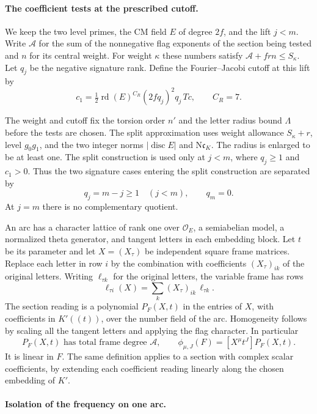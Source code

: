 \paragraph{The coefficient tests at the prescribed cutoff.}
We keep the two level primes, the CM field \(E\) of degree \(2f\),
and the lift \(j<m\). Write \(\mathcal A\) for the sum of the
nonnegative flag exponents of the section being tested and \(n\)
for its central weight. For weight \(\kappa\) these numbers satisfy
\(\mathcal A+frn\le S_\kappa\). Let \(q_j\) be the negative signature rank. Define the
Fourier--Jacobi cutoff at this lift by
\[
 c_1=\tfrac12\operatorname{rd}(E)^{C_R}(2fq_j)^2q_j\,Tc,
 \qquad C_R=7 .
\]

The weight and cutoff fix the torsion order \(n'\) and the letter
radius bound \(\Lambda\) before the tests are chosen.
The split approximation uses weight allowance \(S_\kappa+r\),
level \(g_0g_1\), and the two integer norms
\(|\operatorname{disc}E|\) and \(\mathrm N\mathfrak c_K\).
The radius is enlarged to be at least one. The split construction
is used only at \(j<m\), where \(q_j\ge1\) and \(c_1>0\).
Thus the two signature cases entering the split construction are separated by
\[
  q_j=m-j\ge1\quad(j<m),\qquad q_m=0 .
\]
At \(j=m\) there is no complementary quotient.
\label{cor:slice-cm-coefficients-1}

An arc has a character lattice of rank one over \(\mathcal O_E\), a semiabelian model,
a normalized theta generator, and tangent letters in each
embedding block. Let \(t\) be its parameter and let \(X=(X_\tau)\)
be independent square frame matrices. Replace each letter in
row \(i\) by the combination with coefficients \((X_\tau)_{ik}\)
of the original letters.
Writing \(\ell_{\tau k}\) for the original letters, the variable frame has rows
\[
  \ell_{\tau i}(X)=\sum_k(X_\tau)_{ik}\,\ell_{\tau k}.
\]
 The section reading is a polynomial
\(P_F(X,t)\) in the entries of \(X\), with coefficients in
\(K'((t))\), over the number field of the arc. Homogeneity follows
by scaling all the tangent letters and applying the flag character.
In particular
\[
 P_F(X,t)\text{ has total frame degree }\mathcal A,
 \qquad \phi_{\mu,J}(F)=[X^\mu t^J]P_F(X,t).
\]
It is linear in \(F\). The same definition applies to a section
with complex scalar coefficients, by extending each coefficient
reading linearly along the chosen embedding of \(K'\).



\paragraph{Isolation of the frequency on one arc.}

